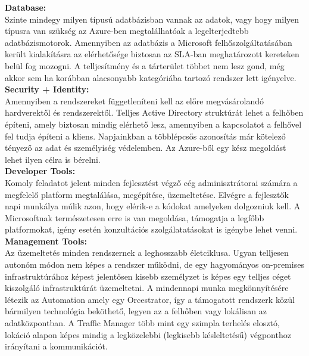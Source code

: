 \documentclass[12pt,oneside,justify,table]{book}
\begin{document}
\noindent \textbf{Database:}\\
Szinte mindegy milyen típusú adatbázisban vannak az adatok, vagy hogy milyen típusra van szükség az Azure-ben megtalálhatóak a legelterjedtebb adatbázismotorok. Amennyiben az adatbázis a Microsoft felhőszolgáltatásában került kialakításra az elérhetősége biztosan az SLA-ban meghatározott kereteken belül fog mozogni. A telljesítmény és a tárterület többet nem lesz gond, még akkor sem ha korábban alacsonyabb kategóriába tartozó rendszer lett igényelve. \\

\noindent \textbf{Security + Identity:}\\
Amennyiben a rendszereket függetleníteni kell az előre megvásárolandó hardverektől és rendszerektől. Telljes Active Directory struktúrát lehet a felhőben építeni, amely biztosan mindig elérhető lesz, amennyiben a kapcsolatot a felhővel fel tudja építeni a kliens. Napjainkban a többlépcsős azonosítás már kötelező tényező az adat és személyiség védelemben. Az Azure-ből egy kész megoldást lehet ilyen célra is bérelni. \\

\noindent \textbf{Developer Tools:}\\
Komoly feladatot jelent minden fejlesztést végző cég adminisztrátorai számára a megfelelő platform megtalálása, megépítése, üzemeltetése. Elvégre a fejlesztők napi munkálya múlik azon, hogy elérik-e a kódokat amelyeken dolgozniuk kell. A Microsoftnak természetesen erre is van megoldása, támogatja a legfőbb platformokat, igény esetén konzultációs szolgálatatásokat is igénybe lehet venni. \\

\noindent \textbf{Management Tools:}\\
Az üzemeltetés minden rendszernek a leghosszabb életciklusa. Ugyan telljesen autonóm módon nem képes a rendszer működni, de egy hagyományos on-premises infrastruktúrához képest jelentősen kisebb személyzet is képes egy telljes céget kiszolgáló infrastruktúrát üzemeltetni. A mindennapi munka megkönnyítésére létezik az Automation amely egy Orcestrator, így a támogatott rendszerk közül bármilyen technológia beköthető, legyen az a felhőben vagy lokálisan az adatközpontban. A Traffic Manager több mint egy szimpla terhelés elosztó, lokáció alapon képes mindig a legközelebbi (legkisebb késleltetésű) végponthoz irányítani a kommunikációt. 
\end{document}
